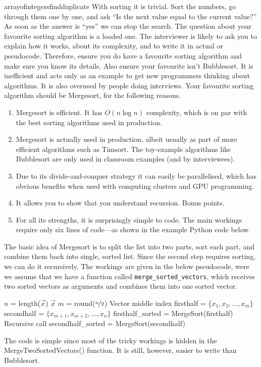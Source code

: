 \begin{answer}{arrayofintegersfindduplicate}
 With sorting it is trivial.
 Sort the numbers, go through them one by one, and ask ``Is the next value equal to the current value?''
 As soon as the answer is ``yes'' we can stop the search.
 The question about your favourite sorting algorithm is a loaded one.
 The interviewer is likely to ask you to explain how it works, about its complexity, and to write it in actual or pseudocode.
 Therefore, ensure you do have a favourite sorting algorithm and make sure you know its details.
 Also ensure your favourite isn't Bubblesort.
 It is inefficient and acts only as an example to get new programmers thinking about algorithms.
 It is also overused by people doing interviews.
Your favourite sorting algorithm should be Mergesort, for the following reasons.
 \begin{enumerate}
   \item Mergesort is efficient. It has $O(n \log n)$ complexity, which is on par with the best sorting algorithms used in production.
   \item Mergesort is actually used in production, albeit usually as part of more efficient algorithms such as Timsort. The toy-example algorithms like Bubblesort are only used in classroom examples (and by interviewees).
   \item Due to its divide-and-conquer strategy it can easily be parallelised, which has obvious benefits when used with computing clusters and GPU programming.
   \item It allows you to show that you understand recursion. Bonus points.
   \item For all its strengths, it is surprisingly simple to code. The main workings require only six lines of code---as shown in the example Python code below.
 \end{enumerate}
The basic idea of Mergesort is to split the list into two parts, sort each part, and combine them back into single, sorted list.
Since the second step requires sorting, we can do it recursively.
The workings are given in the below pseudocode, were we assume that we have a function called
\verb+merge_sorted_vectors+,
which receives two sorted vectors as arguments and combines them into one sorted vector.

\begin{algorithmic}[1]
  \Statex
  \State
        $n$ = length($\vec{x}$)
      \State
      \Return $\vec{x}$
     \EndIf
  \State
  $m$ = round($\nicefrac{n}{2}$) \Comment Vector middle index
  \State
  firsthalf = $\{x_1, x_2, \ldots ,x_m\}$
  \State
  secondhalf = $\{x_{m+1}, x_{m+2}, \ldots, x_n \}$
  \State
  firsthalf\_sorted = MergeSort(firsthalf)
  \Comment Recursive call
  \State
  secondhalf\_sorted = MergeSort(secondhalf)
      \State {}
  \EndFunction
\end{algorithmic}
The code is simple since most of the tricky workings is hidden in the MergeTwoSortedVectors() function.
It is still, however, easier to write than Bubblesort.


\end{answer}
